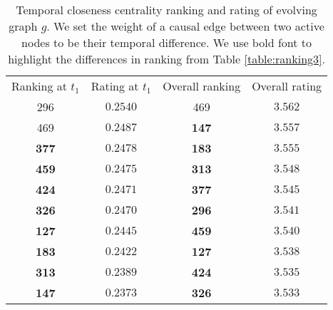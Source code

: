 \documentclass[12pt]{article}
\theoremstyle{definition}
\begin{document}
\begin{table}[h]
  \begin{center}
\begin{tabular}{ c | c | c | c }
  Ranking at $t_1$ & Rating at $t_1$ & Overall ranking & Overall rating \\
   296 & $0.2540$ & 469 & $3.562$ \\
   469 & $0.2487$ & \textbf{147} & $3.557$ \\
   \textbf{377} & $0.2478$ & \textbf{183} & $3.555$ \\
   \textbf{459} & $0.2475$ & \textbf{313} & $3.548$ \\
   \textbf{424} & $0.2471$ & \textbf{377} & $3.545$ \\
   \textbf{326} & $0.2470$ & \textbf{296} & $3.541$ \\
   \textbf{127} & $0.2445$ & \textbf{459} & $3.540$ \\
   \textbf{183} & $0.2422$ & \textbf{127} & $3.538$ \\
   \textbf{313} & $0.2389$ & \textbf{424} & $3.535$ \\
   \textbf{147} & $0.2373$ & \textbf{326} & $3.533$ \\
\end{tabular}
\end{center}
\caption{Temporal closeness centrality ranking and rating of evolving graph $g$.
We set the weight of a causal edge between two active nodes to be their temporal difference.
We use bold font to highlight the differences in ranking from Table \ref{table:ranking3}.}
\label{table:ranking4}
\end{table}



%
%
%
%
%
%
%
%
\end{document}

